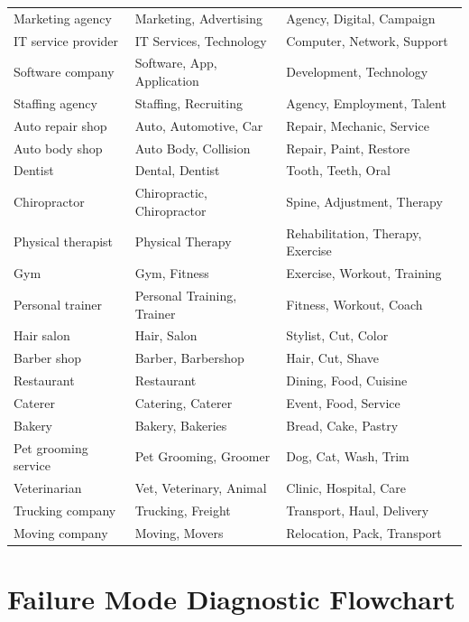 \documentclass[12pt, openany]{book}
\theoremstyle{thmstyle}
\theoremstyle{defstyle}
\begin{document}
\begin{longtable}{p{2.2in}p{1.5in}p{2.0in}}
Marketing agency & Marketing, Advertising & Agency, Digital, Campaign \\
IT service provider & IT Services, Technology & Computer, Network, Support \\
Software company & Software, App, Application & Development, Technology \\
Staffing agency & Staffing, Recruiting & Agency, Employment, Talent \\
Auto repair shop & Auto, Automotive, Car & Repair, Mechanic, Service \\
Auto body shop & Auto Body, Collision & Repair, Paint, Restore \\
Dentist & Dental, Dentist & Tooth, Teeth, Oral \\
Chiropractor & Chiropractic, Chiropractor & Spine, Adjustment, Therapy \\
Physical therapist & Physical Therapy & Rehabilitation, Therapy, Exercise \\
Gym & Gym, Fitness & Exercise, Workout, Training \\
Personal trainer & Personal Training, Trainer & Fitness, Workout, Coach \\
Hair salon & Hair, Salon & Stylist, Cut, Color \\
Barber shop & Barber, Barbershop & Hair, Cut, Shave \\
Restaurant & Restaurant & Dining, Food, Cuisine \\
Caterer & Catering, Caterer & Event, Food, Service \\
Bakery & Bakery, Bakeries & Bread, Cake, Pastry \\
Pet grooming service & Pet Grooming, Groomer & Dog, Cat, Wash, Trim \\
Veterinarian & Vet, Veterinary, Animal & Clinic, Hospital, Care \\
Trucking company & Trucking, Freight & Transport, Haul, Delivery \\
Moving company & Moving, Movers & Relocation, Pack, Transport \\
\end{longtable}

\chapter{Failure Mode Diagnostic Flowchart}
\end{document}
